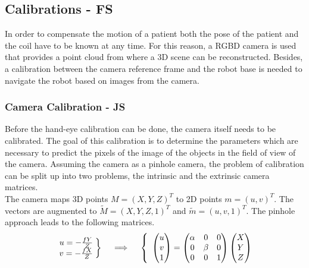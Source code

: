 \documentclass[conference]{IEEEtran}
\begin{document}
\subsection{Calibrations - FS}
\label{ssec:calib}
In order to compensate the motion of a patient both the pose of the patient and the coil have to be known at any time. For this reason, a RGBD camera is used that provides a point cloud from where a 3D scene can be reconstructed. Besides, a calibration between the camera reference frame and the robot base is needed to navigate the robot based on images from the camera. 
\subsubsection{Camera Calibration - JS}
Before the hand-eye calibration can be done, the camera itself needs to be calibrated. The goal of this calibration is to determine the parameters which are necessary to predict the pixels of the image of the objects in the field of view of the camera. Assuming the camera as a pinhole camera, the problem of calibration can be split up into two problems, the intrinsic and the extrinsic camera matrices.\\
The camera maps 3D points \textit{$M = (X,Y,Z)^T$} to 2D points \textit{$m =(u,v)^T$}. The vectors are augmented to \textit{$\tilde{M} = (X,Y,Z,1)^T$} and \textit{$\tilde{m} =(u,v,1)^T$}. The pinhole approach leads to the following matrices.
\begin{align*}
	\left.\begin{array}{r@{\mskip\thickmuskip}l}
	u = -\frac{fY}{Z}\\
	v = -\frac{fX}{Z}\\
	\end{array} \right\}
	\quad \implies \quad
  \left\{\begin{array}{r@{\mskip\thickmuskip}l}
	\begin{pmatrix}
		u\\
		v\\
		1
	\end{pmatrix}
	=
	\begin{pmatrix}
		\alpha&0&0\\
		0&\beta&0\\
		0&0&1
	\end{pmatrix}
	\begin{pmatrix}
		X\\
		Y\\
		Z
	\end{pmatrix}\\
	\end{array}\right.
\end{align*}
\end{document}
